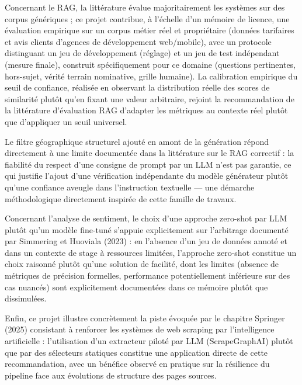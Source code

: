 Concernant le RAG, la littérature évalue majoritairement les systèmes sur des corpus génériques ; ce projet
contribue, à l'échelle d'un mémoire de licence, une évaluation empirique sur un corpus métier réel et
propriétaire (données tarifaires et avis clients d'agences de développement web/mobile), avec un protocole
distinguant un jeu de développement (réglage) et un jeu de test indépendant (mesure finale), construit
spécifiquement pour ce domaine (questions pertinentes, hors-sujet, vérité terrain nominative, grille humaine).
La calibration empirique du seuil de confiance, réalisée en observant la distribution réelle des scores de
similarité plutôt qu'en fixant une valeur arbitraire, rejoint la recommandation de la littérature
d'évaluation RAG \cite{yu2024} d'adapter les métriques au contexte réel plutôt que d'appliquer un seuil
universel.

Le filtre géographique structurel ajouté en amont de la génération répond directement à une limite
documentée dans la littérature sur le RAG correctif \cite{yan2024} : la fiabilité du respect d'une consigne
de prompt par un LLM n'est pas garantie, ce qui justifie l'ajout d'une vérification indépendante du modèle
générateur plutôt qu'une confiance aveugle dans l'instruction textuelle --- une démarche méthodologique
directement inspirée de cette famille de travaux.

Concernant l'analyse de sentiment, le choix d'une approche zero-shot par LLM plutôt qu'un modèle fine-tuné
s'appuie explicitement sur l'arbitrage documenté par Simmering et Huoviala (2023) \cite{simmering2023} : en
l'absence d'un jeu de données annoté et dans un contexte de stage à ressources limitées, l'approche zero-shot
constitue un choix raisonné plutôt qu'une solution de facilité, dont les limites (absence de métriques de
précision formelles, performance potentiellement inférieure sur des cas nuancés) sont explicitement
documentées dans ce mémoire plutôt que dissimulées.

Enfin, ce projet illustre concrètement la piste évoquée par le chapitre Springer (2025) \cite{springer2025}
consistant à renforcer les systèmes de web scraping par l'intelligence artificielle : l'utilisation d'un
extracteur piloté par LLM (ScrapeGraphAI) plutôt que par des sélecteurs statiques constitue une application
directe de cette recommandation, avec un bénéfice observé en pratique sur la résilience du pipeline face aux
évolutions de structure des pages sources.

